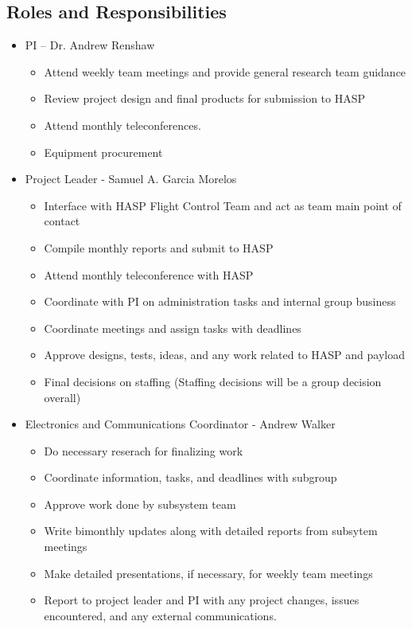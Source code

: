 \subsection{Roles and Responsibilities}
\label{sec:Roles}
\begin{itemize}
\item PI – Dr. Andrew Renshaw
	\begin{itemize}
	\item Attend weekly team meetings and provide general research team guidance
	\item Review project design and final products for submission to HASP
	\item Attend monthly teleconferences.
	\item Equipment procurement
	\end{itemize}
\item Project Leader - Samuel A. Garcia Morelos
	\begin{itemize}
	\item Interface with HASP Flight Control Team and act as team main point of contact
	\item Compile monthly reports and submit to HASP
	\item Attend monthly teleconference with HASP
	\item Coordinate with PI on administration tasks and internal group business
	\item Coordinate meetings and assign tasks with deadlines
	\item Approve designs, tests, ideas, and any work related to HASP and payload
	\item Final decisions on staffing (Staffing decisions will be a group decision overall)
	\end{itemize}
\item Electronics and Communications Coordinator - Andrew Walker
	\begin{itemize}
	\item Do necessary reserach for finalizing work
	\item Coordinate information, tasks, and deadlines with subgroup
	\item Approve work done by subsystem team
	\item Write bimonthly updates along with detailed reports from subsytem meetings
	\item Make detailed presentations, if necessary, for weekly team meetings
	\item Report to project leader and PI with any project changes, issues encountered, and any external communications.

\end{itemize}
\end{itemize}
